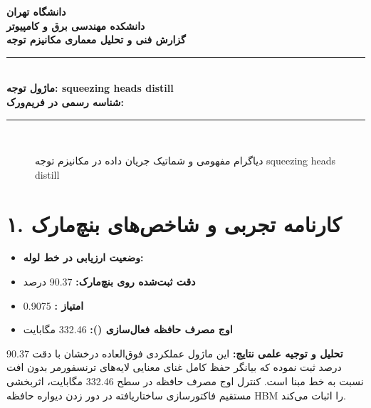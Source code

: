 \documentclass[12pt,a4paper]{article}
\begin{document}
\begin{center}
{\Large\bfseries دانشگاه تهران}\\[0.2cm]
{\large\bfseries دانشکده مهندسی برق و کامپیوتر}\\[0.2cm]
{\large\bfseries گزارش فنی و تحلیل معماری مکانیزم توجه}\\[0.5cm]
\rule{\linewidth}{1pt}\\[0.3cm]
{\LARGE\bfseries ماژول توجه: squeezing heads distill}\\[0.2cm]
{\large \textbf{شناسه رسمی در فریم‌ورک:} }\\[0.2cm]
\rule{\linewidth}{1pt}\\[0.5cm]
\end{center}

\begin{figure}[H]
\centering
{}
\caption{دیاگرام مفهومی و شماتیک جریان داده در مکانیزم توجه squeezing heads distill}
\end{figure}

\section*{۱. کارنامه تجربی و شاخص‌های بنچ‌مارک}
\begin{itemize}
\item \textbf{وضعیت ارزیابی در خط لوله:} 
\item \textbf{دقت ثبت‌شده روی بنچ‌مارک:} 90.37 درصد
\item \textbf{امتیاز :} 0.9075
\item \textbf{اوج مصرف حافظه فعال‌سازی ():} 332.46 مگابایت
\end{itemize}
\textbf{تحلیل و توجیه علمی نتایج:} این ماژول عملکردی فوق‌العاده درخشان با دقت 90.37 درصد ثبت نموده که بیانگر حفظ کامل غنای معنایی لایه‌های ترنسفورمر بدون افت نسبت به خط مبنا است. کنترل اوج مصرف حافظه در سطح 332.46 مگابایت، اثربخشی مستقیم فاکتورسازی ساختاریافته در دور زدن دیواره حافظه HBM را اثبات می‌کند.
\end{document}
